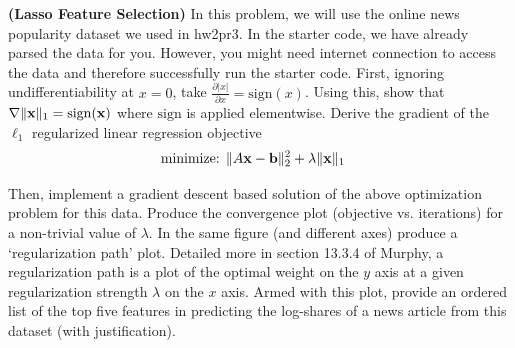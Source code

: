 \documentclass[12pt,letterpaper,fleqn]{hmcpset}
\begin{document}
\begin{problem}[2]
\textbf{(Lasso Feature Selection)} 
In this problem, we will use the online news popularity dataset we used in hw2pr3. In the starter code, we have already parsed the data for you. However, you might need internet connection to access the data and therefore successfully run the starter code.
\newline
\newline
First, ignoring undifferentiability at $x=0$, take $\frac{\partial |x|}{\partial x}
= \mathrm{sign} (x)$. Using this, show that $\nabla \|{\bf x}\|_1 = \mathrm{sign}({\bf x})$ where $\mathrm{sign}$ is applied
elementwise. Derive the gradient of the $\ell_1$ regularized linear regression objective
\begin{align*}
    \text{minimize: } & \|A{\bf x} - {\bf b}\|_2^2 + \lambda \|{\bf x}\|_1
\end{align*}

Then, implement a gradient descent based solution of the above optimization problem for this data. Produce
the convergence plot (objective vs. iterations) for a non-trivial value of $\lambda$.
In the same figure (and different axes) produce a `regularization path' plot. Detailed
more in section 13.3.4 of Murphy, a regularization path is a plot of the optimal weight on
the $y$ axis at a given regularization strength $\lambda$ on the $x$ axis. Armed with this
plot, provide an ordered list of the top five features in predicting the log-shares of a news
article from this dataset (with justification).
\end{problem}
\end{document}

